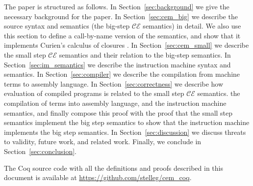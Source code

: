 The paper is structured as follows. In Section~\ref{sec:background} we give the
necessary background for the paper. In Section~\ref{sec:cem_big} we describe the
source syntax and semantics (the big-step $\mathcal{CE}$ semantics) in detail.
We also use this section to define a call-by-name version of the semantics, and
show that it implements Curien's calculus of closures \cite{curien1991abstract}.  In
Section~\ref{sec:cem_small} we describe the small step $\mathcal{CE}$ semantics
and their relation to the big-step semantics. In Section~\ref{sec:im_semantics}
we describe the instruction machine syntax and semantics. In
Section~\ref{sec:compiler} we describe the compilation from machine terms to
assembly language. In Section~\ref{sec:correctness} we describe how evaluation
of compiled programs is related to the small step $\mathcal{CE}$ semantics. the
compilation of terms into assembly language, and the instruction machine
semantics, and finally compose this proof with the proof that the small step
semantics implement the big step semantics to show that the instruction machine
implements the big step semantics. In Section~\ref{sec:discussion} we discuss
threats to validity, future work, and related work. Finally, we conclude in
Section~\ref{sec:conclusion}.

The Coq source code with all the definitions and proofs described in this
document is available at \url{https://github.com/stelleg/cem\_coq}. 
